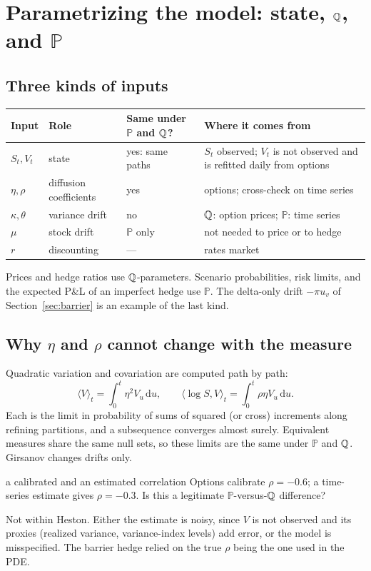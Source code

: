 \documentclass[10pt]{article}
\newcommand{\dd}{\,\mathrm d}\newcommand{\Pp}{\mathbb P}\newcommand{\Var}{\operatorname{Var}}\newcommand{\Cov}{\operatorname{Cov}}
\theoremstyle{definition}\newtheorem{definition}{Definition}[section]
\begin{document}
\section{Parametrizing the model: state, \texorpdfstring{\(\mathbb Q\)}{Q}, and \texorpdfstring{\(\Pp\)}{P}}\label{sec:param}
\subsection{Three kinds of inputs}
\begin{center}
\begin{tabular}{L{.1\textwidth}L{.2\textwidth}L{.2\textwidth}L{.38\textwidth}}
\toprule Input & Role & Same under \(\Pp\) and \(\mathbb Q\)? & Where it comes from\\\midrule
\(S_t,V_t\) & state & yes: same paths & \(S_t\) observed; \(V_t\) is not observed and is refitted daily from options\\[.3em]
\(\eta,\rho\) & diffusion coefficients & yes & options; cross-check on time series\\[.3em]
\(\kappa,\theta\) & variance drift & no & \(\mathbb Q\): option prices; \(\Pp\): time series\\[.3em]
\(\mu\) & stock drift & \(\Pp\) only & not needed to price or to hedge\\[.3em]
\(r\) & discounting & --- & rates market\\\bottomrule
\end{tabular}
\end{center}
Prices and hedge ratios use \(\mathbb Q\)-parameters. Scenario probabilities, risk
limits, and the expected P\&L of an imperfect hedge use \(\Pp\). The
delta-only drift \(-\pi u_v\) of Section~\ref{sec:barrier} is an example of
the last kind.

\subsection{Why \texorpdfstring{\(\eta\)}{eta} and \texorpdfstring{\(\rho\)}{rho} cannot change with the measure}
Quadratic variation and covariation are computed path by path:
\[
\langle V\rangle_t=\int_0^t\eta^2V_u\dd u,\qquad
\langle\log S,V\rangle_t=\int_0^t\rho\eta V_u\dd u.
\]
Each is the limit in probability of sums of squared (or cross) increments
along refining partitions, and a subsequence converges almost surely.
Equivalent measures share the same null sets, so these limits are the same
under \(\Pp\) and \(\mathbb Q\). Girsanov changes drifts only.

\begin{studentexercise}{a calibrated and an estimated correlation}
Options calibrate \(\rho=-0.6\); a time-series estimate gives \(\rho=-0.3\).
Is this a legitimate \(\Pp\)-versus-\(\mathbb Q\) difference?
\end{studentexercise}
\begin{shortsolution}
Not within Heston. Either the estimate is noisy, since \(V\) is not
observed and its proxies (realized variance, variance-index levels) add
error, or the model is misspecified. The barrier hedge relied on the true
\(\rho\) being the one used in the PDE.
\end{shortsolution}
\end{document}
